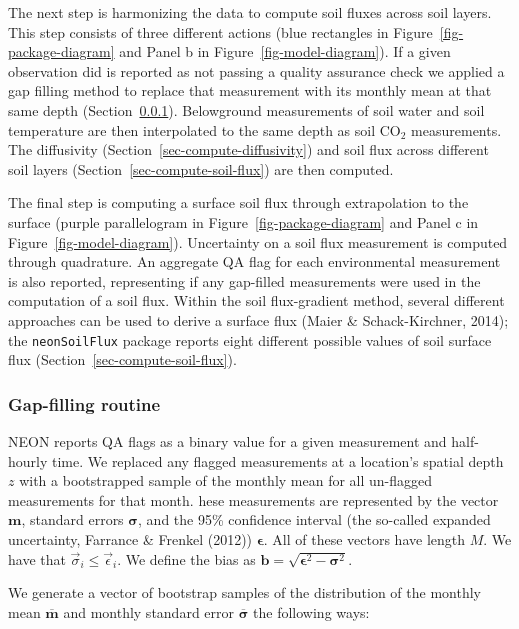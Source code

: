\documentclass[
  letterpaper,
  DIV=11,
  numbers=noendperiod]{scrartcl}
\begin{document}
The next step is harmonizing the data to compute soil fluxes across soil
layers. This step consists of three different actions (blue rectangles
in Figure~\ref{fig-package-diagram} and Panel b in
Figure~\ref{fig-model-diagram}). If a given observation did is reported
as not passing a quality assurance check we applied a gap filling method
to replace that measurement with its monthly mean at that same depth
(Section~\ref{sec-gapfilling}). Belowground measurements of soil water
and soil temperature are then interpolated to the same depth as soil
CO\(_{2}\) measurements. The diffusivity
(Section~\ref{sec-compute-diffusivity}) and soil flux across different
soil layers (Section~\ref{sec-compute-soil-flux}) are then computed.

The final step is computing a surface soil flux through extrapolation to
the surface (purple parallelogram in Figure~\ref{fig-package-diagram}
and Panel c in Figure~\ref{fig-model-diagram}). Uncertainty on a soil
flux measurement is computed through quadrature. An aggregate QA flag
for each environmental measurement is also reported, representing if any
gap-filled measurements were used in the computation of a soil flux.
Within the soil flux-gradient method, several different approaches can
be used to derive a surface flux (Maier \& Schack-Kirchner, 2014); the
\texttt{neonSoilFlux} package reports eight different possible values of
soil surface flux (Section~\ref{sec-compute-soil-flux}).

\subsubsection{Gap-filling routine}\label{sec-gapfilling}

NEON reports QA flags as a binary value for a given measurement and
half-hourly time. We replaced any flagged measurements at a location's
spatial depth \(z\) with a bootstrapped sample of the monthly mean for
all un-flagged measurements for that month. hese measurements are
represented by the vector \(\mathbf{m}\), standard errors
\(\boldsymbol\sigma\), and the 95\% confidence interval (the so-called
expanded uncertainty, Farrance \& Frenkel (2012))
\(\boldsymbol\epsilon\). All of these vectors have length \(M\). We have
that \(\vec{\sigma}_{i}\leq\vec{\epsilon}_{i}\). We define the bias as
\(\mathbf{b}=\sqrt{\boldsymbol\epsilon^{2}-\boldsymbol\sigma^{2}}\).

We generate a vector of bootstrap samples of the distribution of the
monthly mean \(\overline{\boldsymbol{m}}\) and monthly standard error
\(\overline{\boldsymbol\sigma}\) the following ways:
\end{document}
